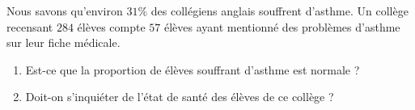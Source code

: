 
\begin{exercice}%
    \label{exosmath-0348}

    Nous savons qu'environ \( 31\%\) des collégiens anglais souffrent d'asthme. Un collège recensant \( 284\) élèves compte \( 57\) élèves ayant mentionné des problèmes d'asthme sur leur fiche médicale.
    \begin{enumerate}
        \item
            Est-ce que la proportion de élèves souffrant d'asthme est normale ?
        \item
            Doit-on s'inquiéter de l'état de santé des élèves de ce collège ?
    \end{enumerate}

\end{exercice}
